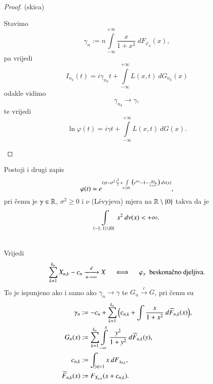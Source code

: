 \begin{proof}{(skica)}
\begin{enumerate}
        Stavimo
        \begin{equation*}
            \gamma_n := n \int\limits_{-\infty}^{+ \infty} \frac{x}{1 + x^2} \: d F_{\varphi_n} (x),
        \end{equation*}
        pa vrijedi
        \begin{equation*}
            I_{n_k} (t) = i \gamma_{n_k} t + \int\limits_{-\infty}^{+\infty} L(x, t) \: d G_{n_k} (x)
        \end{equation*}
        odakle vidimo
        \begin{equation*}
            \gamma_{n_k} \to \gamma,
        \end{equation*}
        te vrijedi
        \begin{equation*}
            \ln \varphi (t) = i \gamma t + \int\limits_{-\infty}^{+\infty} L(x, t) \: d G (x).
        \end{equation*}
    \end{enumerate}
\end{proof}

Postoji i drugi zapis
\begin{equation}    \label{jed:20.17}
    \varphi (t) = e^{ i \gamma t - \sigma^2 \frac{t^2}{2} + \int\limits_{ \mathbb{R} \setminus \{0\}} \big( e^{itx} - 1 - \frac{itx}{1 + x^2} \big) \: d \nu (x) },
\end{equation}
pri \v cemu je $\gamma \in \mathbb{R}$, $\sigma^2 \geq 0$ i $\nu$ (L\' evyjeva) mjera na $\mathbb{R} \setminus \{0\}$ takva da je
\begin{equation*}
    \int\limits_{\langle {-1}, \: {1} \rangle \setminus \{0\}} x^2 \: d \nu (x) < +\infty.
\end{equation*}

\begin{tm}    \label{tm:20.18}
    \quad\\
    Vrijedi
    \begin{equation*}
        \suma{k = 1}{k_n} X_{n, k} - c_n \xrightarrow[n \to \infty]{d} X \quad \iff \quad \varphi_x \; \textnormal{ beskona\v cno djeljiva}.
    \end{equation*}
    To je ispunjeno ako i samo ako $\gamma_n \to \gamma$ te $G_n \xrightarrow{c} G$, pri \v cemu su
    \begin{equation*}   %
        \begin{aligned}
            \gamma_n &:= -c_n + \suma{k = 1}{k_n} \Big( c_{n, k} + \int \frac{x}{1 + x^2} \: d \widetilde{F}_{n, k} (x) \Big),\\
            G_n (x) &:= \suma{k = 1}{k_n} \int\limits_{-\infty}^x \frac{y^2}{1 + y^2} \: d \widetilde{F}_{n, k}(y),\\
            c_{n, k} &:= \int_{|x| < 1} x \: d F_{x_{n, k}},\\
            \widetilde{F}_{n, k} (x) &:= F_{X_{n, k}} (x + c_{n, k}).
        \end{aligned}
    \end{equation*}
\end{tm}